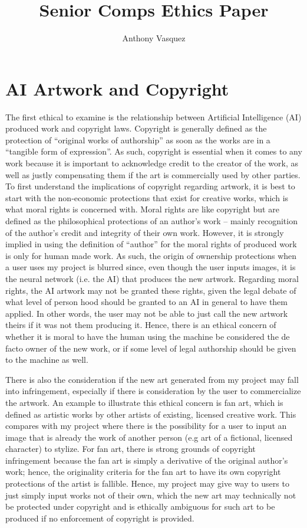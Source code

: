 \documentclass[10pt,twocolumn]{article}
\title{Senior Comps Ethics Paper}
\author{Anthony Vasquez}
\affiliation{Occidental College}
\begin{document}
\maketitle

\section{AI Artwork and Copyright}
The first ethical to examine is the relationship between Artificial Intelligence (AI) produced work and copyright laws. Copyright is generally defined as the protection of “original works of authorship” as soon as the works are in a “tangible form of expression”.\cite{Copyrightgov}  As such, copyright is essential when it comes to any work because it is important to acknowledge credit to the creator of the work, as well as justly compensating them if the art is commercially used by other parties. To first understand the implications of copyright regarding artwork, it is best to start with the non-economic protections that exist for creative works, which is what moral rights is concerned with. Moral rights are like copyright but are defined as the philosophical protections of an author’s work – mainly recognition of the author’s credit and integrity of their own work. However, it is strongly implied in using the definition of “author” for the moral rights of produced work is only for human made work.\cite{miernicki2021artificial}  As such, the origin of ownership protections when a user uses my project is blurred since, even though the user inputs images, it is the neural network (i.e. the AI) that produces the new artwork. Regarding moral rights, the AI artwork may not be granted these rights, given the legal debate of what level of person hood should be granted to an AI in general to have them applied.\cite{miernicki2021artificial}  In other words, the user may not be able to just call the new artwork theirs if it was not them producing it. Hence, there is an ethical concern of whether it is moral to have the human using the machine be considered the de facto owner of the new work, or if some level of legal authorship should be given to the machine as well.

There is also the consideration if the new art generated from my project may fall into infringement, especially if there is consideration by the user to commercialize the artwork. An example to illustrate this ethical concern is fan art, which is defined as artistic works by other artists of existing, licensed creative work. This compares with my project where there is the possibility for a user to input an image that is already the work of another person (e.g art of a fictional, licensed character) to stylize. For fan art, there is strong grounds of copyright infringement because the fan art is simply a derivative of the original author’s work; hence, the originality criteria for the fan art to have its own copyright protections of the artist is fallible.\cite{morgan2020conventional} Hence, my project may give way to users to just simply input works not of their own, which the new art may technically not be protected under copyright and is ethically ambiguous for such art to be produced if no enforcement of copyright is provided.
\end{document}
